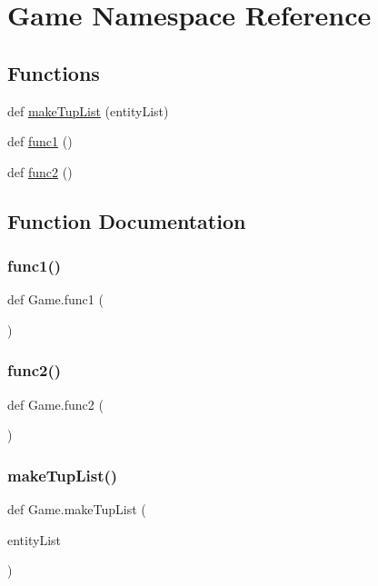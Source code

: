 \hypertarget{namespace_game}{}\section{Game Namespace Reference}
\label{namespace_game}
\subsection*{Functions}
\begin{DoxyCompactItemize}
\item 
def \mbox{\hyperlink{namespace_game_ad473f4521c6c5eb45936ac062815e8ee}{make\+Tup\+List}} (entity\+List)
\item 
def \mbox{\hyperlink{namespace_game_a0a46e1967198035abbe8eb1cde4d95ba}{func1}} ()
\item 
def \mbox{\hyperlink{namespace_game_ae3908fde602ee2498ff3e95476ae78ed}{func2}} ()
\end{DoxyCompactItemize}


\subsection{Function Documentation}
\mbox{\label{namespace_game_a0a46e1967198035abbe8eb1cde4d95ba}} 
\subsubsection{\texorpdfstring{func1()}{func1()}}
{\footnotesize\ttfamily def Game.\+func1 (\begin{DoxyParamCaption}{ }\end{DoxyParamCaption})}

\mbox{\label{namespace_game_ae3908fde602ee2498ff3e95476ae78ed}} 
\subsubsection{\texorpdfstring{func2()}{func2()}}
{\footnotesize\ttfamily def Game.\+func2 (\begin{DoxyParamCaption}{ }\end{DoxyParamCaption})}

\mbox{\label{namespace_game_ad473f4521c6c5eb45936ac062815e8ee}} 
\subsubsection{\texorpdfstring{makeTupList()}{makeTupList()}}
{\footnotesize\ttfamily def Game.\+make\+Tup\+List (\begin{DoxyParamCaption}\item[{}]{entity\+List }\end{DoxyParamCaption})}


